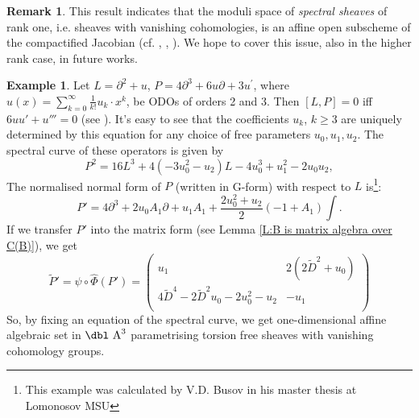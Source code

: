\documentclass[11pt]{article}
\theoremstyle{definition}
\newcommand{\da}{{\mbox{\dbl A}}}
\newtheorem{rem}{Remark}[section]
\newtheorem{ex}{Example}[section]
\theoremstyle{plain}
\numberwithin{equation}{section}
\begin{document}
\begin{rem}
\label{R:moduli}
This result indicates that the moduli space of {\it spectral sheaves} of rank one, i.e. sheaves with vanishing cohomologies, is an affine open subscheme of the compactified Jacobian (cf. \cite{MM}, \cite{Souza}, \cite{Rego}). We hope to cover this issue, also in the higher rank case, in future works.
\end{rem}


\begin{ex}
\label{Ex:Wallenberg}
Let $L=\partial^2+u$, $P=4 \partial^3+6 u \partial+3 u^{\prime}$, where  $u(x)=\sum_{k=0}^{\infty} \frac{1}{k !} u_k \cdot x^k$, be  ODOs of orders 2 and 3. Then  $[L,P]=0$ iff $6u u' +u'''=0$ (see \cite{Wall}). It's easy to see that the coefficients $u_k$, $k\ge 3$ are uniquely determined by this equation for any choice of free parameters $u_0, u_1, u_2$.  The spectral curve 
of these operators is given by 
$$
P^2=16 L^3+4\left(-3 u_0^2-u_2\right) L-4 u_0^3+u_1^2-2 u_0 u_2,
$$
The normalised normal form of $P$ (written in G-form) with respect to $L$ is\footnote{This example was calculated by V.D. Busov in his master thesis at Lomonosov MSU}:
$$
P' =4 \partial^3 + 2u_0A_{1}\partial+u_1A_1+\frac{2u_0^2+u_2}{2}(-1+A_{1})\int .
$$
If we transfer $P'$ into the matrix form (see Lemma \ref{L:B is matrix algebra over C(B)}), we get
$$
\tilde{P}'=\psi\circ\hat{\Phi}(P')=\left(
\begin{array}{cc}
	u_1 & 2 \left(2 \tilde{D}^2+u_0\right) \\
	4 \tilde{D}^4-2 \tilde{D}^2 u_0-2 u_0^2-u_2 & -u_1 \\
\end{array}
\right)
$$
So, by fixing an equation of the spectral curve, we get one-dimensional affine algebraic set in $\da^3$ parametrising torsion free sheaves with vanishing cohomology groups.  
\end{ex}
\end{document}
